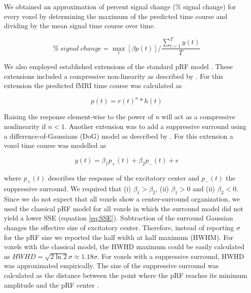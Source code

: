 We obtained an approximation of percent signal change (\% signal change) for every voxel by determining the maximum of the predicted time course and dividing by the mean signal time course over time.

\begin{equation}
\%\ signal\ change = \max_t[\beta p(t)] / \frac{\sum_{t=1}^{T}y(t)}{T}
\end{equation}

We also employed established extensions of the standard pRF model \parencite{Zuiderbaan2012, Kay2013}. These extensions included a compressive non-linearity as described by \cite{Kay2013, Kay2015}. For this extension the predicted fMRI time course was calculated as

\begin{equation}
p(t) = r(t)^n \ast h(t)
\end{equation}

Raising the response element-wise to the power of \textit{n} will act as a compressive nonlinearity if $n < 1$. Another extension was to add a suppressive surround using a difference-of-Gaussians (DoG) model as described by \cite{Zuiderbaan2012}. For this extension a voxel time course was modelled as

\begin{equation}
y(t) = \beta_1 p_+(t) + \beta_2 p_-(t) + e
\end{equation}

where $p_+(t)$ describes the response of the excitatory center and $p_-(t)$ the suppressive surround. We required that (i) $\beta_1 > \beta_2$, (ii) $\beta_1 > 0$ and (ii) $\beta_2 < 0$. Since we do not expect that all voxels show a center-surround organization, we used the classical pRF model for all voxels in which the surround model did not yield a lower SSE (equation \ref{eq:SSE}). Subtraction of the surround Gaussian changes the effective size of excitatory center. Therefore, instead of reporting $\sigma$ for the pRF size we reported the half width at half maximum (HWHM). For voxels with the classical model, the HWHD maximum could be easily calculated as $HWHD = \sqrt{2 \ln{2}} \sigma \approx 1.18 \sigma $. For voxels with a suppressive surround, HWHD was approximated empirically. The size of the suppressive surround was calculated as the distance between the point where the pRF reaches its minimum amplitude and the pRF center \parencite{Zuiderbaan2012}.

